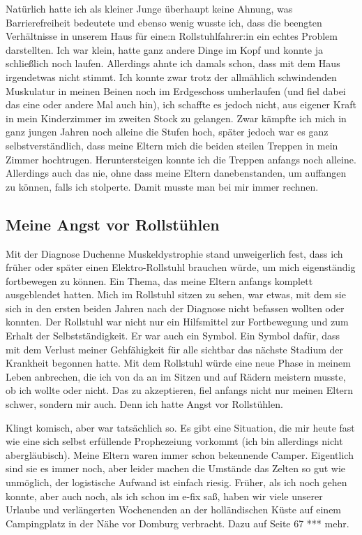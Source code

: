 \documentclass[fontsize=14pt,a4paper,headinclude,DIV=calc,automark]{scrbook}
\begin{document}
Natürlich hatte ich als kleiner Junge überhaupt keine Ahnung, was Barrierefreiheit bedeutete und ebenso wenig wusste ich, dass die beengten Verhältnisse in unserem Haus für eine:n Rollstuhlfahrer:in ein echtes Problem darstellten. Ich war klein, hatte ganz andere Dinge im Kopf und konnte ja schließlich noch laufen. Allerdings ahnte ich damals schon, dass mit dem Haus irgendetwas nicht stimmt. Ich konnte zwar trotz der allmählich schwindenden Muskulatur in meinen Beinen noch im Erdgeschoss umherlaufen (und fiel dabei das eine oder andere Mal auch hin), ich schaffte es jedoch nicht, aus eigener Kraft in mein Kinderzimmer im zweiten Stock zu gelangen. Zwar kämpfte ich mich in ganz jungen Jahren noch alleine die Stufen hoch, später jedoch war es ganz selbstverständlich, dass meine Eltern mich die beiden steilen Treppen in mein Zimmer hochtrugen. Heruntersteigen konnte ich die Treppen anfangs noch alleine. Allerdings auch das nie, ohne dass meine Eltern danebenstanden, um auffangen zu können, falls ich stolperte. Damit musste man bei mir immer rechnen.

\subsection{Meine Angst vor Rollstühlen}

Mit der Diagnose Duchenne Muskeldystrophie stand unweigerlich fest, dass ich früher oder später einen Elektro-Rollstuhl brauchen würde, um mich eigenständig fortbewegen zu können. Ein Thema, das meine Eltern anfangs komplett ausgeblendet hatten. Mich im Rollstuhl sitzen zu sehen, war etwas, mit dem sie sich in den ersten beiden Jahren nach der Diagnose nicht befassen wollten oder konnten. Der Rollstuhl war nicht nur ein Hilfsmittel zur Fortbewegung und zum Erhalt der Selbstständigkeit. Er war auch ein Symbol. Ein Symbol dafür, dass mit dem Verlust meiner Gehfähigkeit für alle sichtbar das nächste Stadium der Krankheit begonnen hatte. Mit dem Rollstuhl würde eine neue Phase in meinem Leben anbrechen, die ich von da an im Sitzen und auf Rädern meistern musste, ob ich wollte oder nicht. Das zu akzeptieren, fiel anfangs nicht nur meinen Eltern schwer, sondern mir auch. Denn ich hatte Angst vor Rollstühlen.

Klingt komisch, aber war tatsächlich so. Es gibt eine Situation, die mir heute fast wie eine sich selbst erfüllende Prophezeiung vorkommt (ich bin allerdings nicht abergläubisch). Meine Eltern waren immer schon bekennende Camper. Eigentlich sind sie es immer noch, aber leider machen die Umstände das Zelten so gut wie unmöglich, der logistische Aufwand ist einfach riesig. Früher, als ich noch gehen konnte, aber auch noch, als ich schon im e-fix saß, haben wir viele unserer Urlaube und verlängerten Wochenenden an der holländischen Küste auf einem Campingplatz in der Nähe vor Domburg verbracht. Dazu auf Seite 67 *** mehr.
\end{document}
